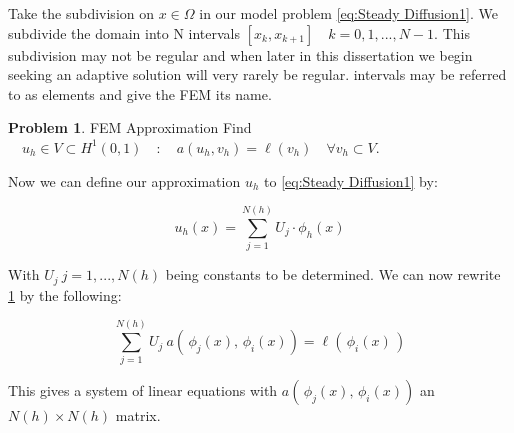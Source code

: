 \documentclass{uonmathreport}
\theoremstyle{definition}
\theoremstyle{problem}
\newtheorem{problem}{Problem}[section]
\theoremstyle{theorem}
\begin{document}
Take the subdivision on $x \in \Omega$ in our model problem \ref{eq:Steady Diffusion1}. We subdivide the domain into N intervals $[x_k, x_{k+1}] \quad k=0, 1, ... , N-1$. This subdivision may not be regular and when later in this dissertation we begin seeking an adaptive solution will very rarely be regular. intervals may be referred to as elements and give the FEM its name.
\\
\begin{center}
\end{center}


\vspace{5mm} %

\begin{problem}{FEM Approximation} \label{prob:Approx1}
Find $\quad u_h \in  V\subset H^1(0, 1) \quad : \quad a(u_h, v_h) =  \ell(v_h) \quad \forall v_h \subset V.$
\end{problem}

Now we can define our approximation $u_h$ to \ref{eq:Steady Diffusion1} by:

\begin{equation*}
u_h(x) = \sum_{j=1}^{N(h)} U_j \cdot \phi_h(x)
\end{equation*}

With $U_j \: j = 1, ..., N(h)$ being constants to be determined. We can now rewrite \ref{prob:Approx1} by the following:

\begin{equation*}
\sum_{j=1}^{N(h)}U_j \: a( \,\phi_j(x),\, \phi_i(x)) = \ell(\,\phi_i(x)\,) 
\end{equation*}

This gives a system of linear equations with $a( \,\phi_j(x),\, \phi_i(x))$ an $N(h)\times N(h)$ matrix. 
\end{document}
